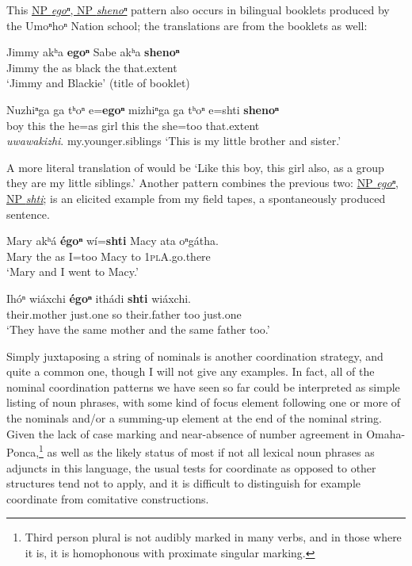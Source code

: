 \documentclass[output=paper]{LSP/langsci}
\begin{document}
This \underline{NP \textit{egoⁿ}, NP \textit{shenoⁿ}} pattern also occurs in bilingual booklets produced by the Umoⁿhoⁿ Nation school; the translations are from the booklets as well:
	
\begin{exe}	
\ex
\gll Jimmy 	akʰa \textbf{egoⁿ} Sabe akʰa \textbf{shenoⁿ} \\
Jimmy the  	as 	black 	the  	that.extent \\
\trans `Jimmy and Blackie' (title of booklet)

\ex 
\gll Nuzhiⁿga ga tʰoⁿ e=\textbf{egoⁿ} mizhiⁿga ga  tʰoⁿ e=shti 	\textbf{shenoⁿ}  \\
boy 	this 	the 	he=as   	girl   this the she=too  that.extent 	 \\

\textit{uwawakizhi}.
my.younger.siblings
\trans `This is my little brother and sister.' 	
\end{exe}	 
	
A more literal translation of  would be `Like this boy, this girl also, as a group they are my little siblings.' Another pattern combines the previous two:   \underline{NP \textit{egoⁿ}, NP \textit{shti}};  is an elicited example from my field tapes,  a spontaneously produced sentence. 

\begin{exe}	
\ex
\gll Mary akʰ\'a \textbf{\'egoⁿ}  w\'i=\textbf{shti} Macy 	ata 	oⁿg\'atha. \\
Mary the as I=too Macy to 	\textsc{1plA}.go.there \\
\trans`Mary and  I went to Macy.'

\ex
\gll Ih\'oⁿ  wi\'axchi  \textbf{\'egoⁿ} ith\'adi  \textbf{shti} wi\'axchi. \\
their.mother  just.one so their.father too just.one \\
\trans `They have the same mother and the same father too.'
\end{exe}	

Simply juxtaposing a string of nominals is another coordination strategy, and quite a common one, though I will not give any examples. In fact, all of the nominal coordination patterns we have seen so far could be interpreted as simple listing of noun phrases, with some kind of focus element following one or more of the nominals and/or a summing-up element at the end of the nominal string. Given the lack of case marking and near-absence of number agreement  in Omaha-Ponca,\footnote{Third person plural is not audibly marked in many verbs, and in those where it is, it is homophonous with
proximate singular marking.} as well as the likely status of most if not all lexical noun phrases as adjuncts in this language, the usual tests for coordinate as opposed to other structures tend not to apply, and it is difficult to distinguish for example coordinate from comitative constructions.
\end{document}
